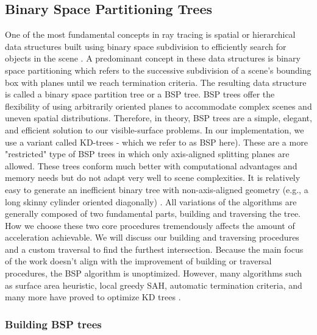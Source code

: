 \documentclass[a4paper,11pt,oneside]{article}
\begin{document}
\subsection{Binary Space Partitioning Trees}
\label{section:bsp-optimization}

One of the most fundamental concepts in ray tracing is spatial or hierarchical data structures built using binary space subdivision to efficiently search for objects in the scene \cite{ray_tracing_BSP2}. A predominant concept in these data structures is binary space partitioning which refers to the successive subdivision of a scene's bounding box with planes until we reach termination criteria. The resulting data structure is called a binary space partition tree or a BSP tree. BSP trees offer the flexibility of using arbitrarily oriented planes to accommodate complex scenes and uneven spatial distributions. Therefore, in theory, BSP trees are a simple, elegant, and efficient solution to our visible-surface problems. In our implementation, we use a variant called KD-trees - which we refer to as BSP here). These are a more "restricted" type of BSP trees in which only axis-aligned splitting planes are allowed. These trees conform much better with computational advantages and memory needs but do not adapt very well to scene complexities. It is relatively easy to generate an inefficient binary tree with non-axis-aligned geometry (e.g., a long skinny cylinder oriented diagonally) \cite{ray_tracing_BSP}. All variations of the algorithms are generally composed of two fundamental parts, building and traversing the tree. How we choose these two core procedures tremendously affects the amount of acceleration achievable. We will discuss our building and traversing procedures and a custom traversal to find the furthest intersection. Because the main focus of the work doesn't align with the improvement of building or traversal procedures, the BSP algorithm is unoptimized. However, many algorithms such as surface area heuristic, local greedy SAH, automatic termination criteria, and many more have proved to optimize KD trees \cite{fast_building_kd_trees, parallel_kd_tree_construction}.

\subsubsection{Building BSP trees}
\end{document}
